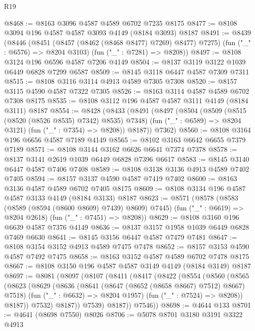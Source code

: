 \begin{lexlean}{R19}
\begin{coremodule}
@8468 := @8163 @3096 @4587 @4589 @6702 @7235 @8175
@8477 := @8108 @3094 @196 @4587 @4587 @3093 @4149 (@8184 @3093) @8187
@8491 := @8439
    (@8446
      (@8451 (@8457 (@8462 (@8468 @8477) @7269) @8477) @7275)
      (fun ("_" : @6576) => @8204 @3103)
      (fun ("_" : @7281) => @8208))
@8497 := @8108 @3124 @196 @6596 @4587 @7206 @4149
@8504 := @8137 @3119 @3122 @1039 @6449 @6828 @7299 @6587
@8509 := @8145 @3118 @6447 @4587 @7309 @7311
@8515 := @8108 @3116 @3114 @4913 @4589 @7305 @7308
@8520 := @8157 @3115 @4590 @4587 @7322 @7305
@8526 := @8163 @3114 @4587 @4589 @6702 @7308 @8175
@8535 := @8108 @3112 @196 @4587 @4587 @3111 @4149 (@8184 @3111) @8187
@8554 := @8428
    (@8433
      (@8491
        (@8497
          (@8504
            (@8509 (@8515 (@8520 (@8526 @8535) @7342) @8535) @7348)
            (fun ("_" : @6589) => @8204 @3121)
            (fun ("_" : @7354) => @8208))
          @8187))
      @7362)
@8560 := @8108 @3164 @196 @6656 @4587 @7189 @4149
@8565 := @8102 @3163 @6642 @6655 @7379 @7189
@8571 := @8108 @3144 @3162 @6626 @6641 @7374 @7378
@8578 := @8137 @3141 @2619 @1039 @6449 @6828 @7396 @6617
@8583 := @8145 @3140 @6447 @4587 @7406 @7408
@8589 := @8108 @3138 @3136 @4913 @4589 @7402 @7405
@8594 := @8157 @3137 @4590 @4587 @7419 @7402
@8600 := @8163 @3136 @4587 @4589 @6702 @7405 @8175
@8609 := @8108 @3134 @196 @4587 @4587 @3133 @4149 (@8184 @3133) @8187
@8623 := @8571
    (@8578
      (@8583 (@8589 (@8594 (@8600 @8609) @7439) @8609) @7445)
      (fun ("_" : @6619) => @8204 @2618)
      (fun ("_" : @7451) => @8208))
@8629 := @8108 @3160 @196 @6639 @4587 @7376 @4149
@8636 := @8137 @3157 @1958 @1039 @6449 @6828 @7469 @6630
@8641 := @8145 @3156 @6447 @4587 @7479 @7481
@8647 := @8108 @3154 @3152 @4913 @4589 @7475 @7478
@8652 := @8157 @3153 @4590 @4587 @7492 @7475
@8658 := @8163 @3152 @4587 @4589 @6702 @7478 @8175
@8667 := @8108 @3150 @196 @4587 @4587 @3149 @4149 (@8184 @3149) @8187
@8697 := @8081
    (@8097
      (@8107
        (@8411
          (@8417
            (@8422
              (@8554
                (@8560
                  (@8565
                    (@8623
                      (@8629
                        (@8636
                          (@8641 (@8647 (@8652 (@8658 @8667) @7512) @8667) @7518)
                          (fun ("_" : @6632) => @8204 @1957)
                          (fun ("_" : @7524) => @8208))
                        @8187))
                    @7532)
                  @8187))
              @7539)
            @8187))
        @7546))
@8698 := @4644 @133
@8701 := @4641 (@8698 @7550) @8026
@8706 := @5078 @8701 @3180 @3191 @3322 @4913

\end{coremodule}
\end{lexlean}
